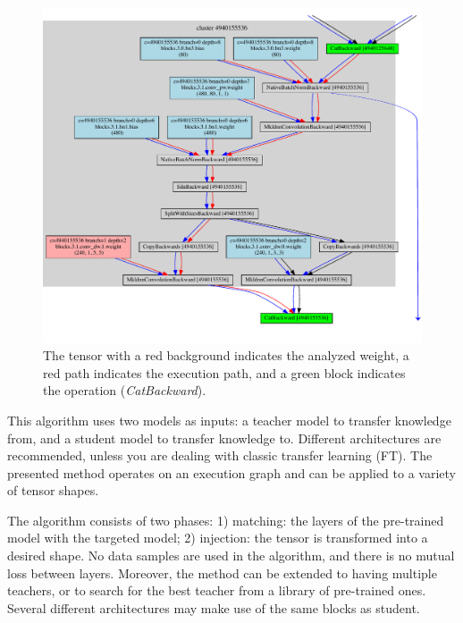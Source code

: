 \documentclass{article} %
\begin{document}
\begin{figure}
	\vspace{-7mm}
	\center\includegraphics[width=\linewidth]{figures/v1_path_algorithm}
	\vspace{-7mm}
	\vskip -5pt
	\caption{The tensor with a red background indicates the analyzed weight, a red path
	indicates the execution path, and a green block indicates the operation
	(\textit{CatBackward}).}
    \label{fig:path_algo}
	\vspace{-10mm}
\end{figure}

This algorithm uses two models as inputs: a teacher model to transfer knowledge
from, and a student model to transfer knowledge to.
%
Different architectures are recommended, unless you are dealing with classic
transfer learning (FT).
%
The presented method operates on an execution graph and can be applied to a
variety of tensor shapes.

The algorithm consists of two phases:
1) matching: the layers of the pre-trained model with the targeted model;
2) injection: the tensor is transformed into a desired shape.
%
No data samples are used in the algorithm, and there is no mutual loss between layers.
%
Moreover, the method can be extended to having multiple teachers, or to search for the best teacher from a library of pre-trained ones.
%
Several different architectures may make use of the same blocks as student.
\end{document}
